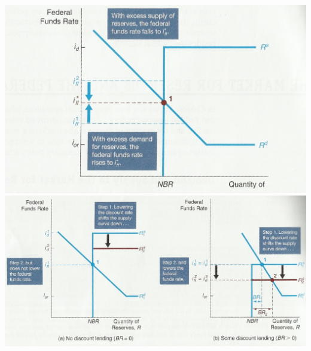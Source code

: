 \documentclass[12pt]{examnotes}
\begin{document}
\begin{center}
  \includegraphics[scale=0.4]{./imgs/chapter6fig1.jpg}
  \includegraphics[scale=0.5]{./imgs/chapter16fig3.jpg}
\end{center}
\end{document}
